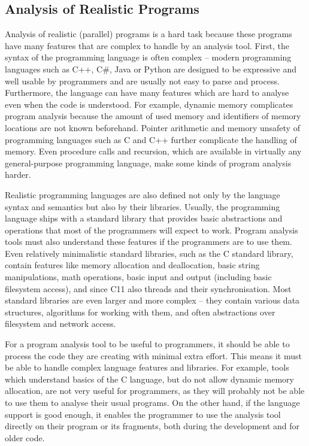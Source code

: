 \subsection{Analysis of Realistic Programs}\label{sec:intro:programs}

Analysis of realistic (parallel) programs is a hard task because these programs have many features that are complex to handle by an analysis tool.
First, the syntax of the programming language is often complex -- modern programming languages such as C++, C\#, Java or Python are designed to be expressive and well usable by programmers and are usually not easy to parse and process.
Furthermore, the language can have many features which are hard to analyse even when the code is understood.
For example, dynamic memory complicates program analysis because the amount of used memory and identifiers of memory locations are not known beforehand.
Pointer arithmetic and memory unsafety of programming languages such as C and C++ further complicate the handling of memory.
Even procedure calls and recursion, which are available in virtually any general-purpose programming language, make some kinds of program analysis harder.

Realistic programming languages are also defined not only by the language syntax and semantics but also by their libraries.
Usually, the programming language ships with a standard library that provides basic abstractions and operations that most of the programmers will expect to work.
Program analysis tools must also understand these features if the programmers are to use them.
Even relatively minimalistic standard libraries, such as the C standard library, contain features like memory allocation and deallocation, basic string manipulations, math operations, basic input and output (including basic filesystem access), and since C11 also threads and their synchronisation.
Most standard libraries are even larger and more complex -- they contain various data structures, algorithms for working with them, and often abstractions over filesystem and network access.

For a program analysis tool to be useful to programmers, it should be able to process the code they are creating with minimal extra effort.
This means it must be able to handle complex language features and libraries.
For example, tools which understand basics of the C language, but do not allow dynamic memory allocation, are not very useful for programmers, as they will probably not be able to use them to analyse their usual programs.
On the other hand, if the language support is good enough, it enables the programmer to use the analysis tool directly on their program or its fragments, both during the development and for older code.


